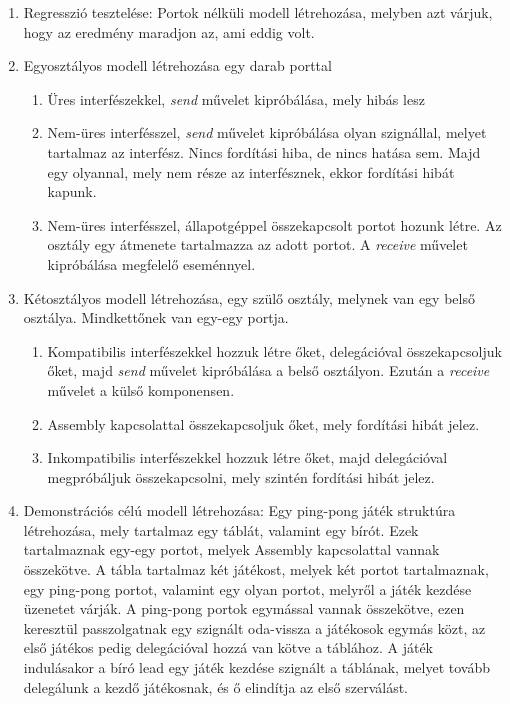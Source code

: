\documentclass[a4paper,12pt]{report}
\begin{document}
\begin{enumerate}
\item Regresszió tesztelése: Portok nélküli modell létrehozása, melyben azt várjuk, hogy az eredmény maradjon az, ami eddig volt.
\item Egyosztályos modell létrehozása egy darab porttal
\begin{enumerate}
\item Üres interfészekkel, \textit{send} művelet kipróbálása, mely hibás lesz
\item Nem-üres interfésszel, \textit{send} művelet kipróbálása olyan szignállal, melyet tartalmaz az interfész. Nincs fordítási hiba, de nincs hatása sem. Majd egy olyannal, mely nem része az interfésznek, ekkor fordítási hibát kapunk.
\item Nem-üres interfésszel, állapotgéppel összekapcsolt portot hozunk létre. Az osztály egy átmenete tartalmazza az adott portot. A \textit{receive} művelet kipróbálása megfelelő eseménnyel.
\end{enumerate}
\item Kétosztályos modell létrehozása, egy szülő osztály, melynek van egy belső osztálya. Mindkettőnek van egy-egy portja.
\begin{enumerate}
\item Kompatibilis interfészekkel hozzuk létre őket, delegációval összekapcsoljuk őket, majd \textit{send} művelet kipróbálása a belső osztályon. Ezután a \textit{receive} művelet a külső komponensen.
\item Assembly kapcsolattal összekapcsoljuk őket, mely fordítási hibát jelez.
\item Inkompatibilis interfészekkel hozzuk létre őket, majd delegációval megpróbáljuk összekapcsolni, mely szintén fordítási hibát jelez.
\end{enumerate}
\item Demonstrációs célú modell létrehozása: Egy ping-pong játék struktúra létrehozása, mely tartalmaz egy táblát, valamint egy bírót. Ezek tartalmaznak egy-egy portot, melyek Assembly kapcsolattal vannak összekötve. A tábla tartalmaz két játékost, melyek két portot tartalmaznak, egy ping-pong portot, valamint egy olyan portot, melyről a játék kezdése üzenetet várják. A ping-pong portok egymással vannak összekötve, ezen keresztül passzolgatnak egy szignált oda-vissza a játékosok egymás közt, az első játékos pedig delegációval hozzá van kötve a táblához. A játék indulásakor a bíró lead egy játék kezdése szignált a táblának, melyet tovább delegálunk a kezdő játékosnak, és ő elindítja az első szerválást.
\end{enumerate}
\end{document}
